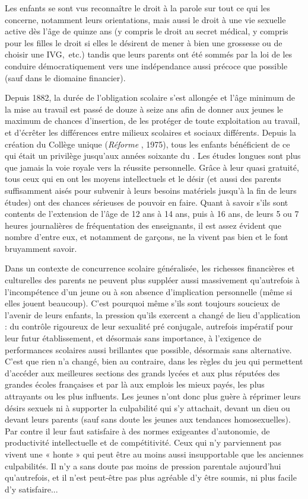 \begin{table}[t]
\begin{table}[t]
 Les enfants se sont vus reconnaître le droit à la parole sur tout ce qui les concerne, notamment leurs orientations, mais aussi le droit à une vie sexuelle active dès l'âge de quinze ans (y compris le droit au secret médical, y compris pour les filles le droit si elles le désirent de mener à bien une grossesse ou de choisir une IVG,~etc.) tandis que leurs parents ont été sommés par la loi de les conduire démocratiquement vers une indépendance aussi précoce que possible (sauf dans le diomaine financier). 

 Depuis 1882, la durée de l'obligation scolaire s'est allongée et l'âge minimum de la mise au travail est passé de douze à seize ans afin de donner aux jeunes le maximum de chances d'insertion, de les protéger de toute exploitation au travail, et d'écrêter les différences entre milieux scolaires et sociaux différents. Depuis la création du Collège unique (\emph{Réforme }, 1975), tous les enfants bénéficient de ce qui était un privilège jusqu'aux années soixante du . Les études longues sont plus que jamais la voie royale vers la réussite personnelle. Grâce à leur quasi gratuité, tous ceux qui en ont les moyens intellectuels et le désir (et aussi des parents suffisamment aisés pour subvenir à leurs besoins matériels jusqu'à la fin de leurs études) ont des chances sérieuses de pouvoir en faire. Quant à savoir s'ils sont contents de l'extension de l'âge de 12 ans à 14 ans, puis à 16 ans, de leurs 5 ou 7 heures journalières de fréquentation des enseignants, il est assez évident que nombre d'entre eux, et notamment de garçons, ne la vivent pas bien et le font bruyamment savoir.

 Dans un contexte de concurrence scolaire généralisée, les richesses financières et culturelles des parents ne peuvent plus suppléer aussi massivement qu'autrefois à l'incompétence d'un jeune ou à son absence d'implication personnelle (même si elles jouent beaucoup). C'est pourquoi même s'ils sont toujours soucieux de l'avenir de leurs enfants, la pression qu'ils exercent a changé de lieu d'application : du contrôle rigoureux de leur sexualité pré conjugale, autrefois impératif pour leur futur établissement, et désormais sans importance, à l'exigence de performances scolaires aussi brillantes que possible, désormais sans alternative. C'est que rien n'a changé, bien au contraire, dans les règles du jeu qui permettent d'accéder aux meilleures sections des grands lycées et aux plus réputées des grandes écoles françaises et par là aux emplois les mieux payés, les plus attrayants ou les plus influents. Les jeunes n'ont donc plus guère à réprimer leurs désirs sexuels ni à supporter la culpabilité qui s'y attachait, devant un dieu ou devant leurs parents (sauf sans doute les jeunes aux tendances homosexuelles). Par contre il leur faut satisfaire à des normes exigeantes d'autonomie, de productivité intellectuelle et de compétitivité. Ceux qui n'y parviennent pas vivent une « honte » qui peut être au moins aussi insupportable que les anciennes culpabilités. Il n'y a sans doute pas moins de pression parentale aujourd'hui qu'autrefois, et il n'est peut-être pas plus agréable d'y être soumis, ni plus facile d'y satisfaire... 


\end{table}
\end{table}
